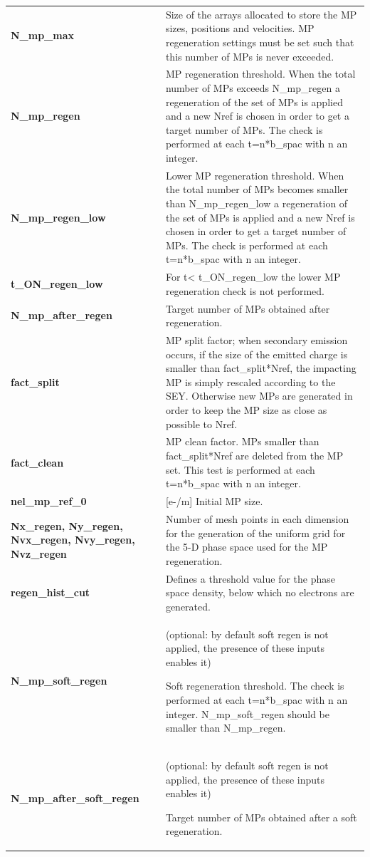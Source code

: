\documentclass[a4paper,12pt]{article}
\begin{document}
\begin{longtable}{p{}p{}}
\hline\endfirsthead\hline\endhead\rowcolor{Gray}
\multicolumn{2}{p{.97\textwidth}}{
\textbf{MP management settings}
}\\ \hline
\textbf{N\_mp\_max}&	Size of the arrays allocated to store the MP sizes, positions and velocities. MP regeneration settings must be set such that this number of MPs is never exceeded.\\ \hline
\textbf{N\_mp\_regen}& 	MP regeneration threshold. When the total number of MPs exceeds N\_mp\_regen a regeneration of the set of MPs is applied and a new Nref is chosen in order to get a target number of MPs. The check is performed at each t=n*b\_spac with n an integer.\\ \hline
\textbf{N\_mp\_regen\_low}&	Lower MP regeneration threshold. When the total number of MPs becomes smaller than N\_mp\_regen\_low a regeneration of the set of MPs is applied and a new Nref is chosen in order to get a target number of MPs. The check is performed at each t=n*b\_spac with n an integer.\\ \hline
\textbf{t\_ON\_regen\_low}&	For t< t\_ON\_regen\_low the lower MP regeneration check is not performed.\\ \hline
\textbf{N\_mp\_after\_regen}&	Target number of MPs obtained after regeneration.\\ \hline
\textbf{fact\_split}&	MP split factor; when secondary emission occurs, if the size of the emitted charge is smaller than fact\_split*Nref, the impacting MP is simply rescaled according to the SEY. Otherwise new MPs are generated in order to keep the MP size as close as possible to Nref.\\ \hline
\textbf{fact\_clean}&	MP clean factor. MPs smaller than fact\_split*Nref are deleted from the MP set. This test is performed at each t=n*b\_spac with n an integer.\\ \hline
\textbf{nel\_mp\_ref\_0}&	[e-/m] Initial MP size.\\ \hline
\textbf{Nx\_regen, Ny\_regen, Nvx\_regen, Nvy\_regen, Nvz\_regen}&	Number of mesh points in each dimension for the generation of the uniform grid for the 5-D phase space used for the MP regeneration.\\ \hline
\textbf{regen\_hist\_cut}&	Defines a threshold value for the phase space density, below which no electrons are generated.\\ \hline
\textbf{N\_mp\_soft\_regen}&	(optional: by default soft regen is not applied, the presence of these inputs enables it)

Soft regeneration threshold. The check is performed at each t=n*b\_spac with n an integer. N\_mp\_soft\_regen should be smaller than N\_mp\_regen.\\ \hline
\textbf{N\_mp\_after\_soft\_regen}&	(optional: by default soft regen is not applied, the presence of these inputs enables it)

Target number of MPs obtained after a soft regeneration.\\
\hline
\end{longtable}
\end{document}
